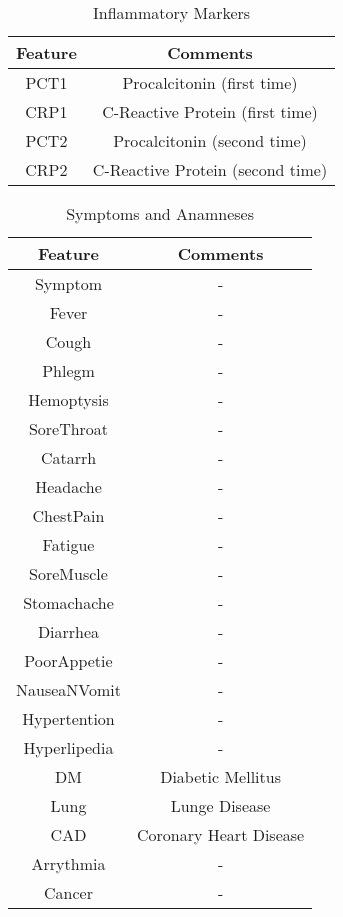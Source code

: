 \clearpage

\null
\vfill

\begin{table}[H]
\centering
\begin{tabular}{@{}cc@{}}
\toprule
Feature                   & Comments  \\ 
\toprule
PCT1 &	Procalcitonin (first time)  \\
CRP1 &	C-Reactive Protein (first time)  \\
PCT2 &	Procalcitonin (second time)  \\
CRP2 &	C-Reactive Protein (second time) \\
\bottomrule
\end{tabular}
\caption{Inflammatory Markers}
\end{table}

\begin{table}[H]
\centering
\begin{tabular}{@{}cc@{}}
\toprule
Feature                   & Comments  \\ 
\toprule
Symptom & -		 \\
Fever & -	\\
Cough & -	 \\
Phlegm & -	 \\
Hemoptysis & -	  \\
SoreThroat & -\\
Catarrh & - \\
Headache & -	 \\
ChestPain & - \\
Fatigue & -	 \\
SoreMuscle & -	 \\
Stomachache & -		 \\
Diarrhea & -	 \\
PoorAppetie & -	 \\
NauseaNVomit & -  \\
Hypertention & -	  \\
Hyperlipedia & -	 \\
DM & Diabetic Mellitus\\
Lung & Lunge Disease	 \\
CAD & Coronary Heart Disease	 \\
Arrythmia & -  \\
Cancer & -  \\
\bottomrule
\end{tabular}
\caption{Symptoms and Anamneses}
\end{table}

